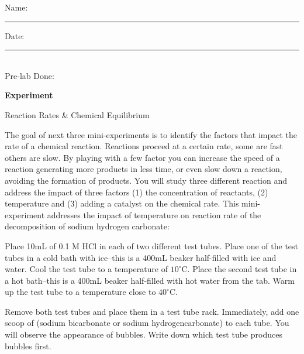 \documentclass[main.tex]{subfiles}
\begin{document}
\clearpage\mbox{}\clearpage



\begin{multicols}{2}
\begin{tcolorbox}[enhanced jigsaw,breakable,size=title,
colback=mybrown!05,colframe=black,fonttitle=\bfseries,
title=STUDENT INFO,pad at break=1mm, break at=15cm/0pt ]
\vspace{0.2cm}
\noindent Name: \rule{5cm}{0.4pt}Date:\rule{1cm}{0.4pt}\\
Pre-lab Done: \quad
\end{tcolorbox}
\end{multicols}
\hfill
\vspace{0.2cm}
\begin{center}
{\large \bfseries 
Experiment
\par
\Huge
Reaction Rates \&  Chemical Equilibrium
\\[5pt] \par}
\vspace{0.2cm}
\end{center}
\par
\noindent
\uline{  \hfill \normalsize \hfill       }

\vspace{0.2cm}{\large \bfseries 1. Factors that affect the chemical rate. Effect of temperature}
The goal of next three mini-experiments is to identify the factors that impact the rate of a chemical reaction. Reactions proceed at a certain rate, some are fast others are slow. By playing with a few factor you can increase the speed of a reaction generating more products in less time, or even slow down a reaction, avoiding the formation of products. You will study three different reaction and address the impact of three factors (1) the concentration of reactants, (2) temperature and (3) adding a catalyst on the chemical rate. This mini-experiment addresses the impact of temperature on reaction rate of the decomposition of sodium hydrogen carbonate:
\begin{center}\end{center}
\begin{steps}
    \newstep[] Place 10mL of 0.1 M HCl in each of two different test tubes.
    \newstep[] Place one of the test tubes in a cold bath with ice--this is a 400mL beaker half-filled with ice and water. Cool the test tube to a temperature of $10^\circ$C.
        \newstep[]  Place the second test tube in a hot bath--this is a 400mL beaker half-filled with hot water from the tab. Warm up the test tube to a temperature close to $40^\circ$C.

            \newstep[] Remove both test tubes and place them in a test tube rack. Immediately, add one scoop of  (sodium bicarbonate or sodium hydrogencarbonate) to each tube. You will observe the appearance of bubbles. Write down which test tube produces bubbles first.
\end{steps}
\end{document}
